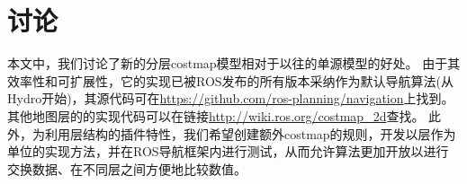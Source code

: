 \section{讨论}
本文中，我们讨论了新的分层costmap模型相对于以往的单源模型的好处。 
由于其效率性和可扩展性，它的实现已被ROS发布的所有版本采纳作为默认导航算法(从Hydro开始)，其源代码可在\url{https://github.com/ros-planning/navigation}上找到。 
其他地图层的的实现代码可以在链接\url{http://wiki.ros.org/costmap_2d}查找。 
此外，为利用层结构的插件特性，我们希望创建额外costmap的规则，开发以层作为单位的实现方法，并在ROS导航框架内进行测试，从而允许算法更加开放以进行交换数据、在不同层之间方便地比较数值。

